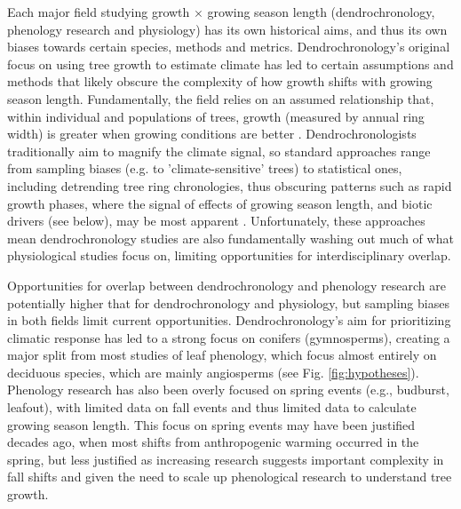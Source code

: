 \documentclass[11pt]{article}
\begin{document}
Each major field studying growth $\times$ growing season length (dendrochronology, phenology research and physiology) has its own historical aims, and thus its own biases towards certain species, methods and metrics. Dendrochronology's original focus on using tree growth to estimate climate has led to certain assumptions and methods that likely obscure the complexity of how growth shifts with growing season length. Fundamentally, the field relies on an assumed relationship that, within individual and populations of trees, growth (measured by annual ring width) is greater when growing conditions are better \citep[e.g.,]{cook2013methods}. Dendrochronologists  traditionally aim to magnify the climate signal, so standard approaches range from sampling biases (e.g. to 'climate-sensitive' trees) to statistical ones, including detrending tree ring chronologies, thus obscuring patterns such as rapid growth phases, where the signal of effects of growing season length, and biotic drivers (see below), may be most apparent \citep{manzanedo2019towards}.  %
Unfortunately, these approaches mean dendrochronology studies are also fundamentally washing out much of what physiological studies focus on, limiting opportunities for interdisciplinary overlap. %

Opportunities for overlap between dendrochronology and phenology research are potentially higher that for dendrochronology and physiology, but sampling biases in both fields limit current opportunities. Dendrochronology's aim for prioritizing climatic response has led to a strong focus on conifers (gymnosperms), creating a major split from most studies of leaf phenology, which focus almost entirely on deciduous species, which are mainly angiosperms (see Fig. \ref{fig:hypotheses}). Phenology research has also been overly focused on spring events (e.g., budburst, leafout), with limited data on fall events and thus limited data to calculate growing season length. This focus on spring events may have been justified decades ago, when most shifts from anthropogenic warming occurred in the spring, but less justified as increasing research suggests important complexity in fall shifts \citep{gill2015,zohner2023effect} and given the need to scale up phenological research to understand tree growth.
\end{document}
